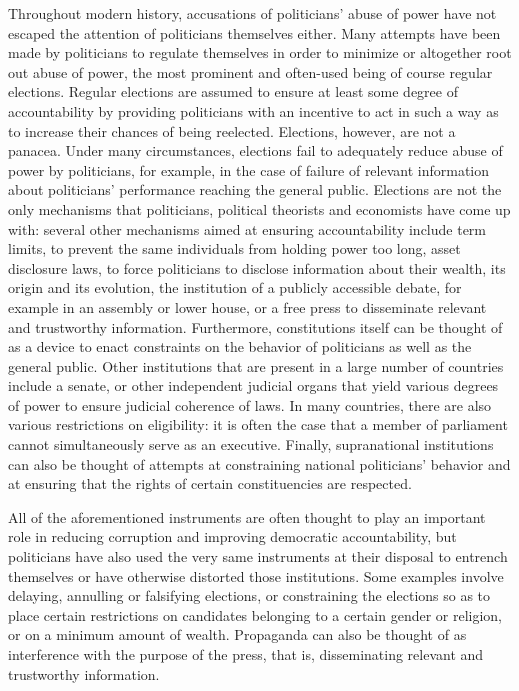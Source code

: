\documentclass[]{book}
\begin{document}
Throughout modern history, accusations of politicians' abuse of power have not escaped the attention of politicians themselves either. Many attempts have been made by politicians to regulate themselves in order to minimize or altogether root out abuse of power, the most prominent and often-used being of course regular elections. Regular elections are assumed to ensure at least some degree of accountability by providing politicians with an incentive to act in such a way as to increase their chances of being reelected. Elections, however, are not a panacea. Under many circumstances, elections fail to adequately reduce abuse of power by politicians, for example, in the case of failure of relevant information about politicians' performance reaching the general public. Elections are not the only mechanisms that politicians, political theorists and economists have come up with: several other mechanisms aimed at ensuring accountability include term limits, to prevent the same individuals from holding power too long, asset disclosure laws, to force politicians to disclose information about their wealth, its origin and its evolution, the institution of a publicly accessible debate, for example in an assembly or lower house, or a free press to disseminate relevant and trustworthy information. Furthermore, constitutions itself can be thought of as a device to enact constraints on the behavior of politicians as well as the general public. Other institutions that are present in a large number of countries include a senate, or other independent judicial organs that yield various degrees of power to ensure judicial coherence of laws. In many countries, there are also various restrictions on eligibility: it is often the case that a member of parliament cannot simultaneously serve as an executive. Finally, supranational institutions can also be thought of attempts at constraining national politicians' behavior and at ensuring that the rights of certain constituencies are respected.

All of the aforementioned instruments are often thought to play an important role in reducing corruption and improving democratic accountability, but politicians have also used the very same instruments at their disposal to entrench themselves or have otherwise distorted those institutions. Some examples involve delaying, annulling or falsifying elections, or constraining the elections so as to place certain restrictions on candidates belonging to a certain gender or religion, or on a minimum amount of wealth. Propaganda can also be thought of as interference with the purpose of the press, that is, disseminating relevant and trustworthy information.
\end{document}
